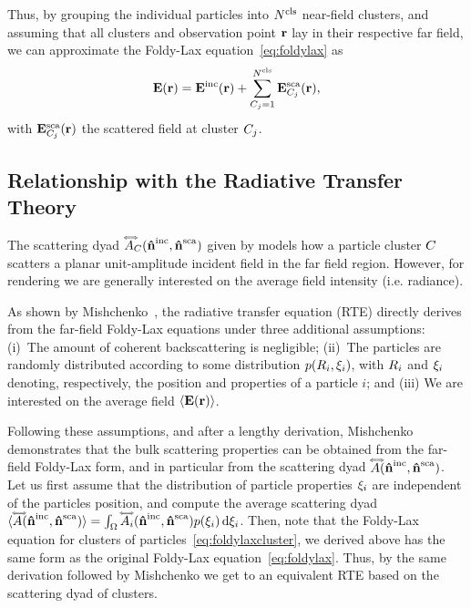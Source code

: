 Thus, by grouping the individual particles into ${N^\text{cls}}$ near-field clusters, and assuming that all clusters and observation point $\mathbf{r}$ lay in their respective far field, we can approximate the Foldy-Lax equation~\eqref{eq:foldylax} as
\begin{equation}
    \mathbf{E}(\mathbf{r}) = \mathbf{E}^\text{inc}(\mathbf{r}) + \sum_{C_j=1}^{{N^\text{cls}}} \mathbf{E}^\text{sca}_{C_j}(\mathbf{r}),
    \label{eq:foldylaxcluster}
\end{equation}
%
with $\mathbf{E}^\text{sca}_{C_j}(\mathbf{r})$ the scattered field at cluster $C_j$. 



\subsection{Relationship with the Radiative Transfer Theory}
\label{ssec:ours_RTT}
%
The scattering dyad $\accentset{\Longleftrightarrow}{A}_C(\mathbf{\hat{n}}^{\text{inc}},\mathbf{\hat{n}}^{\text{sca}})$ given by  models how a particle cluster $C$ scatters a planar unit-amplitude incident field in the far field region. However, for rendering we are generally interested on the average field intensity (i.e. radiance). 

As shown by Mishchenko~, the radiative transfer equation (RTE) directly derives from the far-field Foldy-Lax equations under three additional assumptions: (i)~The amount of coherent backscattering is negligible; (ii)~The particles are randomly distributed according to some distribution $p(R_i,\xi_i)$, with $R_i$ and $\xi_i$ denoting, respectively, the position and properties of a particle $i$; and (iii) We are interested on the average field ${\langle \mathbf{E}(\mathbf{r}) \rangle}$. 

Following these assumptions, and after a lengthy derivation, Mishchenko demonstrates that the bulk scattering properties can be obtained from the far-field Foldy-Lax form, and in particular from the scattering dyad $\accentset{\Longleftrightarrow}{A}(\mathbf{\hat{n}}^{\text{inc}},\mathbf{\hat{n}}^{\text{sca}})$. Let us first assume that the distribution of particle properties $\xi_i$ are independent of the particles position, and compute the average scattering dyad ${\langle \accentset{\Longleftrightarrow}{A}(\mathbf{\hat{n}}^{\text{inc}},\mathbf{\hat{n}}^{\text{sca}}) \rangle} = \int_\Omega \accentset{\Longleftrightarrow}{A}_i(\mathbf{\hat{n}}^{\text{inc}},\mathbf{\hat{n}}^{\text{sca}}) p(\xi_i) \,\text{d}\xi_i$. 
%
Then, note that the Foldy-Lax equation for clusters of particles~\eqref{eq:foldylaxcluster}, we derived above has the same form as the original Foldy-Lax equation~\eqref{eq:foldylax}. Thus, by the same derivation followed by Mishchenko we get to an equivalent RTE based on the scattering dyad of clusters. 

